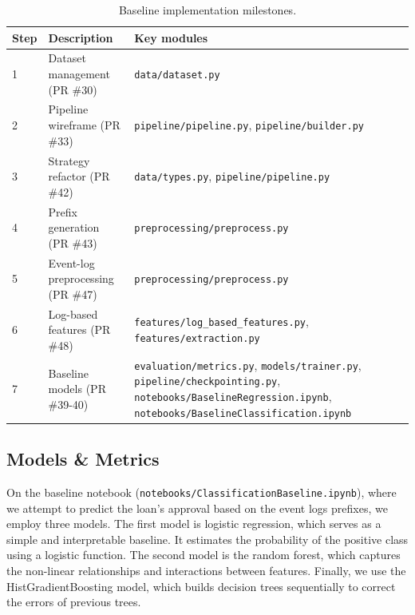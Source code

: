 \documentclass[runningheads]{llncs}
\begin{document}
\begin{table}[H]
    \centering
    \caption{Baseline implementation milestones.}
    \label{tab:milestones}
    \begin{tabularx}{\textwidth}{lXX}
        \toprule
        \textbf{Step} & \textbf{Description}              & \textbf{Key modules}                                                       \\
        \midrule
        1             & Dataset management (PR \#30)      & \texttt{data/dataset.py}                                                   \\
        2             & Pipeline wireframe (PR \#33)      & \texttt{pipeline/pipeline.py}, \texttt{pipeline/builder.py}                \\
        3             & Strategy refactor (PR \#42)       & \texttt{data/types.py}, \texttt{pipeline/pipeline.py}                      \\
        4             & Prefix generation (PR \#43)       & \texttt{preprocessing/preprocess.py}                                       \\
        5             & Event-log preprocessing (PR \#47) & \texttt{preprocessing/preprocess.py}                                       \\
        6             & Log-based features (PR \#48)      & \texttt{features/log\_based\_features.py}, \texttt{features/extraction.py} \\
        7             & Baseline models (PR \#39-40)      & \texttt{evaluation/metrics.py}, \texttt{models/trainer.py},
        \texttt{pipeline/checkpointing.py}, \texttt{notebooks/BaselineRegression.ipynb},
        \texttt{notebooks/BaselineClassification.ipynb}                                                                                \\
        \bottomrule
    \end{tabularx}
\end{table}


\subsection{Models \& Metrics}

On the baseline notebook (\texttt{notebooks/ClassificationBaseline.ipynb}), where we attempt to predict the loan’s approval based on the event logs prefixes, we employ three models. The first model is logistic regression, which serves as a simple and interpretable baseline. It estimates the probability of the positive class using a logistic function. The second model is the random forest, which captures the non-linear relationships and interactions between features. Finally, we use the HistGradientBoosting model, which builds decision trees sequentially to correct the errors of previous trees.
\end{document}
